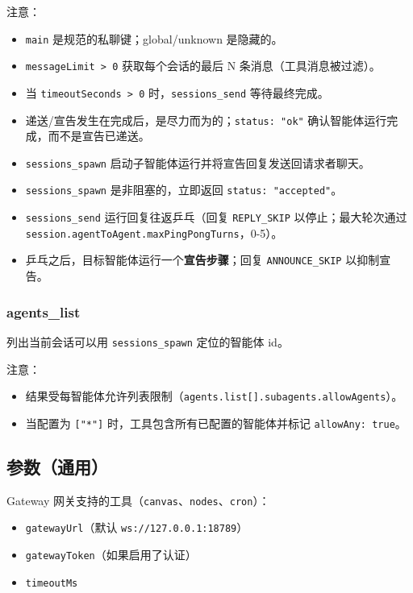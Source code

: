 注意：

\begin{itemize}
  \item \texttt{main} 是规范的私聊键；global/unknown 是隐藏的。
  \item \texttt{messageLimit > 0} 获取每个会话的最后 N 条消息（工具消息被过滤）。
  \item 当 \texttt{timeoutSeconds > 0} 时，\texttt{sessions\_send} 等待最终完成。
  \item 递送/宣告发生在完成后，是尽力而为的；\texttt{status: "ok"} 确认智能体运行完成，而不是宣告已递送。
  \item \texttt{sessions\_spawn} 启动子智能体运行并将宣告回复发送回请求者聊天。
  \item \texttt{sessions\_spawn} 是非阻塞的，立即返回 \texttt{status: "accepted"}。
  \item \texttt{sessions\_send} 运行回复往返乒乓（回复 \texttt{REPLY\_SKIP} 以停止；最大轮次通过 \texttt{session.agentToAgent.maxPingPongTurns}，0-5）。
  \item 乒乓之后，目标智能体运行一个\textbf{宣告步骤}；回复 \texttt{ANNOUNCE\_SKIP} 以抑制宣告。
\end{itemize}


\subsubsection{agents\_list}


列出当前会话可以用 \texttt{sessions\_spawn} 定位的智能体 id。

注意：

\begin{itemize}
  \item 结果受每智能体允许列表限制（\texttt{agents.list[].subagents.allowAgents}）。
  \item 当配置为 \texttt{["*"]} 时，工具包含所有已配置的智能体并标记 \texttt{allowAny: true}。
\end{itemize}


\subsection{参数（通用）}


Gateway 网关支持的工具（\texttt{canvas}、\texttt{nodes}、\texttt{cron}）：

\begin{itemize}
  \item \texttt{gatewayUrl}（默认 \texttt{ws://127.0.0.1:18789}）
  \item \texttt{gatewayToken}（如果启用了认证）
  \item \texttt{timeoutMs}
\end{itemize}


